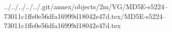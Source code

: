 ../../../../../.git/annex/objects/2m/VG/MD5E-s5224--73011c1ffe0e56dfa16999d18042e47d.tex/MD5E-s5224--73011c1ffe0e56dfa16999d18042e47d.tex